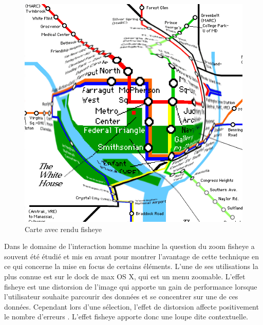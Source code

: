 \begin{figure}[!ht]
	\center	
	\includegraphics[scale=0.4]{image/fisheyeMap.png}
	\caption{Carte avec rendu fisheye}
	\label{fig:fisheyeMap}
\end{figure}

Dans le domaine de l'interaction homme machine la question du zoom fisheye a souvent été étudié \cite{Shneiderman:1986:DUI:6682, Ware:1995:DIM:223355.223749, Cockburn:2009:ROZ:1456650.1456652} et mis en avant pour montrer l'avantage de cette technique en ce qui concerne la mise en focus de certains éléments. L'une de ses utilisations la plus connue est sur le dock de max OS X, qui est un menu zoomable. L'effet fisheye est une distorsion de l'image qui apporte un gain de performance \cite{Bederson:2000:FM:354401.354782, Furnas:1999:FVN:300679.300769, Gutwin:2002:IFT:503376.503424, Gutwin:2003:FGL:642611.642648} lorsque l'utilisateur souhaite parcourir des données et se concentrer sur une de ces données. Cependant lors d'une sélection, l'effet de distorsion affecte positivement le nombre d'erreurs \cite{Gutwin:2002:IFT:503376.503424}. L'effet fisheye apporte donc une loupe dite contextuelle.


